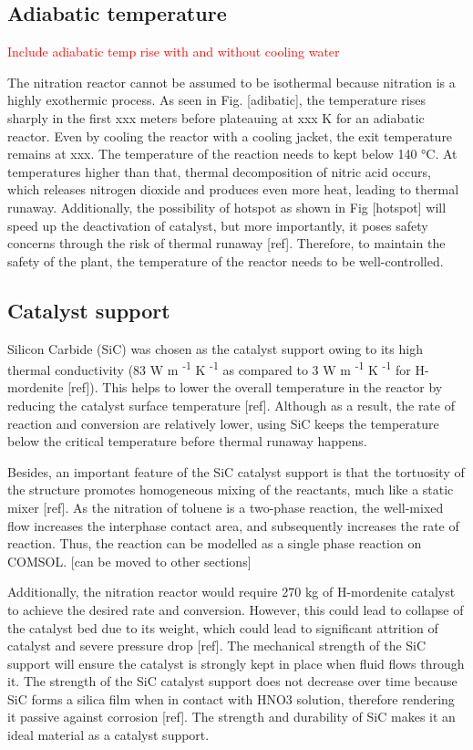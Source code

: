 \subsection{Adiabatic temperature}

\textcolor{red}{Include adiabatic temp rise with and without cooling water}

The nitration reactor cannot be assumed to be isothermal because nitration is a highly exothermic process. As seen in Fig. [adibatic], the temperature rises sharply in the first xxx meters before plateauing at xxx K for an adiabatic reactor. Even by cooling the reactor with a cooling jacket, the exit temperature remains at xxx. The temperature of the reaction needs to kept below 140 °C. At temperatures higher than that, thermal decomposition of nitric acid occurs, which releases nitrogen dioxide and produces even more heat, leading to thermal runaway. Additionally, the possibility of hotspot as shown in Fig [hotspot] will speed up the deactivation of catalyst, but more importantly, it poses safety concerns through the risk of thermal runaway [ref]. Therefore, to maintain the safety of the plant, the temperature of the reactor needs to be well-controlled.

\subsection{Catalyst support}

Silicon Carbide (SiC) was chosen as the catalyst support owing to its high thermal conductivity (83 W m \textsuperscript{-1} K \textsuperscript{-1} as compared to 3 W m \textsuperscript{-1} K \textsuperscript{-1} for H-mordenite [ref]). This helps to lower the overall temperature in the reactor by reducing the catalyst surface temperature [ref]. Although as a result, the rate of reaction and conversion are relatively lower, using SiC keeps the temperature below the critical temperature before thermal runaway happens. 

Besides, an important feature of the SiC catalyst support is that the tortuosity of the structure promotes homogeneous mixing of the reactants, much like a static mixer [ref]. As the nitration of toluene is a two-phase reaction, the well-mixed flow increases the interphase contact area, and subsequently increases the rate of reaction. Thus, the reaction can be modelled as a single phase reaction on COMSOL. [can be moved to other sections] 

Additionally, the nitration reactor would require 270 kg of H-mordenite catalyst to achieve the desired rate and conversion. However, this could lead to collapse of the catalyst bed due to its weight, which could lead to significant attrition of catalyst and severe pressure drop [ref]. The mechanical strength of the SiC support will ensure the catalyst is strongly kept in place when fluid flows through it. The strength of the SiC catalyst support does not decrease over time because SiC forms a silica film when in contact with HNO3 solution, therefore rendering it passive against corrosion [ref]. The strength and durability of SiC makes it an ideal material as a catalyst support.

